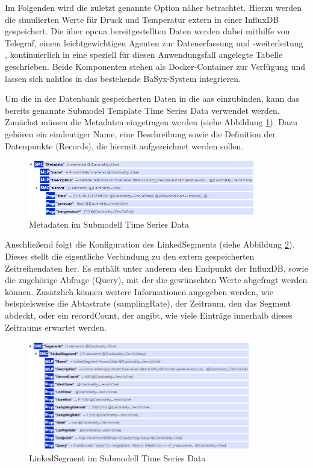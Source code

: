 Im Folgenden wird die zuletzt genannte Option näher betrachtet.
Hierzu werden die simulierten Werte für Druck und Temperatur extern in einer InfluxDB gespeichert.
Die über \acs{opcua} bereitgestellten Daten werden dabei mithilfe von Telegraf, einem leichtgewichtigen Agenten zur Datenerfassung und -weiterleitung \cite{Influx}, kontinuierlich in eine speziell für diesen Anwendungsfall angelegte Tabelle geschrieben.
Beide Komponenten stehen als Docker-Container zur Verfügung und lassen sich nahtlos in das bestehende BaSyx-System integrieren.

Um die in der Datenbank gespeicherten Daten in die \acs{aas} einzubinden, kann das bereits genannte Submodel Template Time Series Data verwendet werden.
Zunächst müssen die Metadaten eingetragen werden (siehe Abbildung \ref{fig:MetadataTimeSeries}).
Dazu gehören ein eindeutiger Name, eine Beschreibung sowie die Definition der Datenpunkte (Records), die hiermit aufgezeichnet werden sollen.

\begin{figure}[htbp]
    \centering
    \includegraphics[width=0.88\textwidth]{Bilder/TimeSeries/MetadataTimeSeries.PNG}
    \caption{Metadaten im Submodell Time Series Data}
    \label{fig:MetadataTimeSeries}
\end{figure}

Anschließend folgt die Konfiguration des LinkedSegments (siehe Abbildung \ref{fig:LinkedSegmentTimeSeries}). 
Dieses stellt die eigentliche Verbindung zu den extern gespeicherten Zeitreihendaten her.
Es enthält unter anderem den Endpunkt der InfluxDB, sowie die zugehörige Abfrage (Query), mit der die gewünschten Werte abgefragt werden können.
Zusätzlich können weitere Informationen angegeben werden, wie beispielsweise die Abtastrate (samplingRate), der Zeitraum, den das Segment abdeckt, oder ein recordCount, der angibt, wie viele Einträge innerhalb dieses Zeitraums erwartet werden.

\begin{figure}[htbp]
    \centering
    \includegraphics[width=0.86\textwidth]{Bilder/TimeSeries/LinkedSegment.PNG}
    \caption{LinkedSegment im Submodell Time Series Data}
    \label{fig:LinkedSegmentTimeSeries}
\end{figure}

